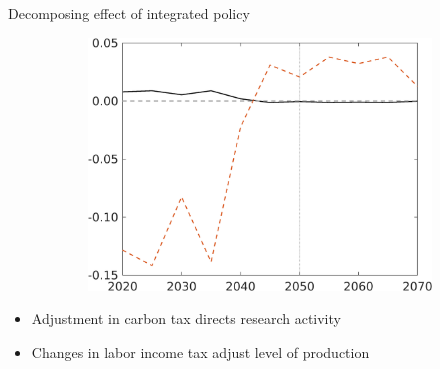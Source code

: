 \documentclass[11pt,aspectratio=169]{beamer}
\begin{document}
\begin{frame}{Decomposing effect of integrated policy}
\begin{figure}
\begin{subfigure}{0.45\textwidth}
			\includegraphics[width=1\textwidth]{../codding_model/own_basedOnFried/optimalPol_010922_revision/figures/all_13Sept22/NewCalib_polTaulFixedTaufJointPer_Y_Sun2_emnet1_spillover0_knspil3_xgr0_nsk0_sep0_extern0_PV1_etaa0.79_lgd0.png}
		\end{subfigure}
	\end{figure}
	\vspace{3mm}
	\begin{block}{}
		\begin{itemize}
			\item Adjustment in carbon tax directs research activity
			\item Changes in labor income tax adjust level of production %
		\end{itemize}
	\end{block}	
\end{frame}


\hypertarget{conc}{}
\end{document}
